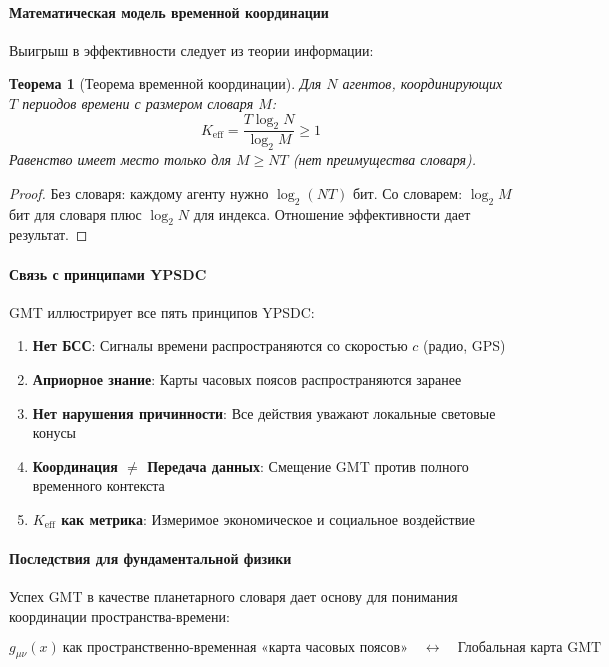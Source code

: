 \documentclass[11pt,a4paper]{article}
\newtheorem{theorem}{Теорема}
\begin{document}
	\paragraph{Математическая модель временной координации}
	Выигрыш в эффективности следует из теории информации:
	
	\begin{theorem}[Теорема временной координации]
		Для $N$ агентов, координирующих $T$ периодов времени с размером словаря $M$:
		\begin{equation}
			K_{\mathrm{eff}} = \frac{T \log_2 N}{\log_2 M} \geq 1
		\end{equation}
		Равенство имеет место только для $M \geq NT$ (нет преимущества словаря).
	\end{theorem}
	
	\begin{proof}
		Без словаря: каждому агенту нужно $\log_2(NT)$ бит. Со словарем: $\log_2 M$ бит для словаря плюс $\log_2 N$ для индекса. Отношение эффективности дает результат.
	\end{proof}
	
	\paragraph{Связь с принципами YPSDC}
	GMT иллюстрирует все пять принципов YPSDC:
	\begin{enumerate}
		\item \textbf{Нет БСС}: Сигналы времени распространяются со скоростью $c$ (радио, GPS)
		\item \textbf{Априорное знание}: Карты часовых поясов распространяются заранее
		\item \textbf{Нет нарушения причинности}: Все действия уважают локальные световые конусы
		\item \textbf{Координация $\neq$ Передача данных}: Смещение GMT против полного временного контекста
		\item \textbf{$K_{\mathrm{eff}}$ как метрика}: Измеримое экономическое и социальное воздействие
	\end{enumerate}
	
	\paragraph{Последствия для фундаментальной физики}
	Успех GMT в качестве планетарного словаря дает основу для понимания координации пространства-времени:
	
	\begin{equation}
		g_{\mu\nu}(x) \ \text{как пространственно-временная «карта часовых поясов»} \quad \leftrightarrow \quad \text{Глобальная карта GMT}
	\end{equation}
	
\end{document}
